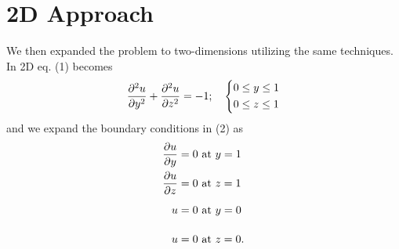 \documentclass[11pt]{article}
\newcommand{\pd}[2]{\frac{\partial #1}{\partial #2}}
\begin{document}
	\section{2D Approach}
	We then expanded the problem to two-dimensions utilizing the same techniques. In 2D eq. (1) becomes
	\begin{equation}
		\pd{^2u}{y^2} + \pd{^2u}{z^2} = -1; \quad \begin{dcases}
		0\leq y\leq 1\\
		0\leq z\leq 1
		\end{dcases}
	\end{equation}
	and we expand the boundary conditions in (2) as
	\begin{align}
		\pd{u}{y} = 0&\text{ at }y=1\\
		\pd{u}{z} = 0&\text{ at }z=1\\
		u = 0&\text{ at }y=0\vphantom{\pd{u}{y}}\\
		u = 0&\text{ at }z=0\vphantom{\pd{u}{y}}.
	\end{align}
\end{document}
